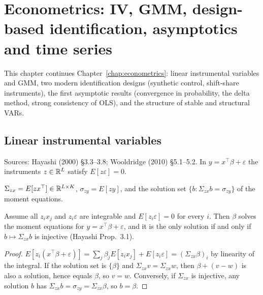 \chapter{Econometrics: IV, GMM, design-based identification, asymptotics and time series}
\label{chap:econometrics2}

This chapter continues Chapter~\ref{chap:econometrics}: linear instrumental variables and GMM, two modern
identification designs (synthetic control, shift-share instruments), the first asymptotic results (convergence in
probability, the delta method, strong consistency of OLS), and the structure of stable and structural VARs.

\section{Linear instrumental variables}
\label{sec:iv}

Sources: Hayashi (2000) \S3.3--3.8; Wooldridge (2010) \S5.1--5.2. In $y = x^\top\beta + \varepsilon$ the instruments
$z\in\mathbb{R}^L$ satisfy $E[z\varepsilon] = 0$.

\begin{definition}
\label{def:iv-moments}
\leanok
$\Sigma_{zx} = E[zx^\top]\in\mathbb{R}^{L\times K}$, $\sigma_{zy} = E[zy]$, and the solution set
$\{b : \Sigma_{zx}b = \sigma_{zy}\}$ of the moment equations.
\end{definition}

\begin{theorem}
\label{thm:iv-rank}
\leanok
{}
Assume all $z_ix_j$ and $z_i\varepsilon$ are integrable and $E[z_i\varepsilon] = 0$ for every $i$. Then $\beta$ solves the
moment equations for $y = x^\top\beta+\varepsilon$, and it is the only solution if and only if $b\mapsto\Sigma_{zx}b$ is
injective (Hayashi Prop.~3.1).
\end{theorem}
\begin{proof}
\leanok
$E[z_i(x^\top\beta+\varepsilon)] = \sum_j\beta_jE[z_ix_j] + E[z_i\varepsilon] = (\Sigma_{zx}\beta)_i$ by linearity of the
integral. If the solution set is $\{\beta\}$ and $\Sigma_{zx}v = \Sigma_{zx}w$, then $\beta + (v-w)$ is also a solution,
hence equals $\beta$, so $v = w$. Conversely, if $\Sigma_{zx}$ is injective, any solution $b$ has
$\Sigma_{zx}b = \sigma_{zy} = \Sigma_{zx}\beta$, so $b = \beta$.
\end{proof}

